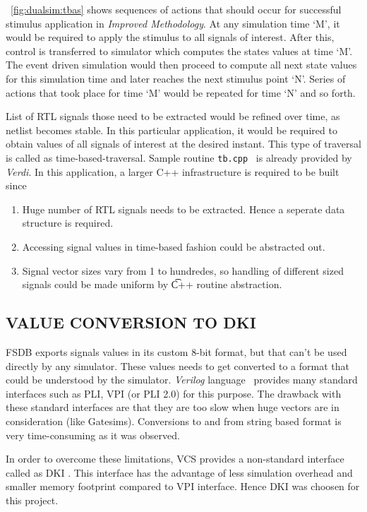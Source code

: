 \figurename~{\ref{fig:dualsim:tbas}} shows sequences of actions that should occur for successful stimulus application in {\it Improved Methodology}. At any simulation time `M', it would be required to apply the stimulus to all signals of interest. After  this, control is transferred to simulator which computes  the states values at time `M'. The event driven simulation  would then proceed to compute all next state values for this simulation time and later reaches the next stimulus point `N'. Series of actions that took place for time `M' would be repeated for time `N'  and so forth.

List of RTL signals those need to be extracted would be refined over time, as netlist becomes stable. In this particular application, it would  be required  to obtain values of all signals of interest at the desired  instant. This type of traversal is called as time-based-traversal. Sample routine \texttt{tb.cpp}~\citep{Verdi:FsdbReader} is already provided by {\it Verdi}. In this application, a larger C++ infrastructure is required to be built since
\begin{enumerate}
\item Huge number of RTL signals needs to be extracted. Hence a seperate data structure is required.
\item Accessing signal values in time-based fashion could be abstracted out.
\item Signal vector sizes vary from 1 to hundredes, so handling of different sized signals could be made uniform by {\t C++} routine abstraction.
\end{enumerate}


\subsection{VALUE CONVERSION TO DKI}
FSDB exports signals values in its custom 8-bit format, but that can't be used directly by any simulator. These values needs to get converted to a format that could be understood by the simulator. {\it Verilog} language~\citep{ieee:v:2005} provides many standard interfaces such as PLI, VPI (or PLI 2.0) for this purpose. The drawback with these standard interfaces are that they are too slow when huge vectors are in consideration (like Gatesims). Conversions to and from string based format is very time-consuming as it was observed.

In order to overcome these limitations, VCS provides a non-standard interface called as DKI . This interface has the advantage of less simulation overhead and smaller memory footprint compared to VPI interface. Hence DKI was choosen for this project.


